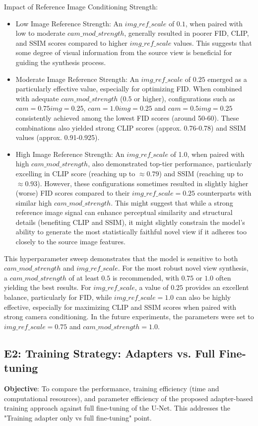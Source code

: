 Impact of Reference Image Conditioning Strength:
\begin{itemize}
  \item Low Image Reference Strength: An $img\_ref\_scale$ of $0.1$, when paired with low to moderate $cam\_mod\_strength$, generally resulted in poorer FID, CLIP, and SSIM scores compared to higher $img\_ref\_scale$ values. This suggests that some degree of visual information from the source view is beneficial for guiding the synthesis process.
  \item Moderate Image Reference Strength: An $img\_ref\_scale$ of $0.25$ emerged as a particularly effective value, especially for optimizing FID. When combined with adequate $cam\_mod\_strength$ ($0.5$ or higher), configurations such as $cam=0.75 img=0.25$, $cam=1.0 img=0.25$ and $cam=0.5 img=0.25$ consistently achieved among the lowest FID scores (around 50-60). These combinations also yielded strong CLIP scores (approx. 0.76-0.78) and SSIM values (approx. 0.91-0.925).
  \item High Image Reference Strength: An $img\_ref\_scale$ of 1.0, when paired with high $cam\_mod\_strength$, also demonstrated top-tier performance, particularly excelling in CLIP score (reaching up to $\approx 0.79$) and SSIM (reaching up to $\approx 0.93$). However, these configurations sometimes resulted in slightly higher (worse) FID scores compared to their $img\_ref\_scale=0.25$ counterparts with similar high $cam\_mod\_strength$. This might suggest that while a strong reference image signal can enhance perceptual similarity and structural details (benefiting CLIP and SSIM), it might slightly constrain the model's ability to generate the most statistically faithful novel view if it adheres too closely to the source image features.
\end{itemize}

This hyperparameter sweep demonstrates that the model is sensitive to both $cam\_mod\_strength$ and $img\_ref\_scale$. For the most robust novel view synthesis, a $cam\_mod\_strength$ of at least $0.5$ is recommended, with $0.75$ or $1.0$ often yielding the best results. For $img\_ref\_scale$, a value of $0.25$ provides an excellent balance, particularly for FID, while $img\_ref\_scale=1.0$ can also be highly effective, especially for maximizing CLIP and SSIM scores when paired with strong camera conditioning.
In the future experiments, the parameters were set to $img\_ref\_scale=0.75$ and $cam\_mod\_strength=1.0$.

\subsection{E2: Training Strategy: Adapters vs. Full Fine-tuning}\label{ssec:exp_adapters_vs_full_finetuning}
\textbf{Objective}:
To compare the performance, training efficiency (time and computational resources), and parameter efficiency of the proposed adapter-based training approach against full fine-tuning of the U-Net. This addresses the "Training adapter only vs full fine-tuning" point.

